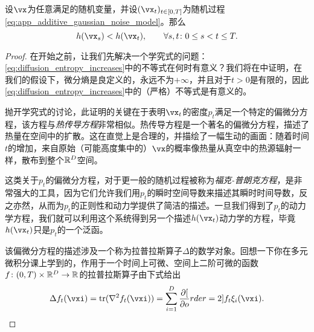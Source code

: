 \documentclass[../../book-main_zh.tex]{subfiles}
\begin{document}
\begin{theorem}[扩散增加熵]\label{thm:diffusion_entropy_increases}
    设\(\vx\)为任意满足的随机变量，并设\((\vx_{t})_{t \in [0, T]}\)为随机过程\eqref{eq:app_additive_gaussian_noise_model}。那么
    \begin{equation}\label{eq:diffusion_entropy_increases}
        h(\vx_{s}) < h(\vx_{t}), \qquad \forall s, t \colon 0 \leq s < t \leq T.
    \end{equation}
\end{theorem}
\begin{proof}
    在开始之前，让我们先解决一个学究式的问题：\eqref{eq:diffusion_entropy_increases}中的不等式在何时有意义？我们将在中证明，在我们的假设下，微分熵是良定义的，永远不为\(+\infty\)，并且对于\(t > 0\)是有限的，因此\eqref{eq:diffusion_entropy_increases}中的（严格）不等式是有意义的。

    抛开学究式的讨论，此证明的关键在于表明\(\vx_{t}\)的密度\(p_{t}\)满足一个特定的偏微分方程，该方程与\textit{热传导方程}非常相似。热传导方程是一个著名的偏微分方程，描述了热量在空间中的扩散。这在直觉上是合理的，并描绘了一幅生动的画面：随着时间\(t\)的增加，来自原始（可能高度集中的）\(\vx\)的概率像热量从真空中的热源辐射一样，散布到整个\(\mathbb{R}^{D}\)空间。
    
    这类关于\(p_{t}\)的偏微分方程，对于更一般的随机过程被称为\textit{福克-普朗克方程}，是非常强大的工具，因为它们允许我们用\(p_{t}\)的瞬时空间导数来描述其瞬时时间导数，反之亦然，从而为\(p_{t}\)的正则性和动力学提供了简洁的描述。一旦我们得到了\(p_{t}\)的动力学方程，我们就可以利用这个系统得到另一个描述\(h(\vx_{t})\)动力学的方程，毕竟\(h(\vx_{t})\)只是\(p_{t}\)的一个泛函。

    该偏微分方程的描述涉及一个称为拉普拉斯算子\(\Delta\)的数学对象。回想一下你在多元微积分课上学到的，作用于一个时间上可微、空间上二阶可微的函数\(f \colon (0, T) \times \mathbb{R}^{D} \to \mathbb{R}\)的拉普拉斯算子由下式给出
    \begin{equation}
        \Delta f_{t}(\vxi) = \tr(\nabla^{2}f_{t}(\vxi)) = \sum_{i = 1}^{D}\pdv[order=2]{f_{t}}{\xi_{i}}(\vxi).
    \end{equation}
    

\end{proof}
\end{document}
